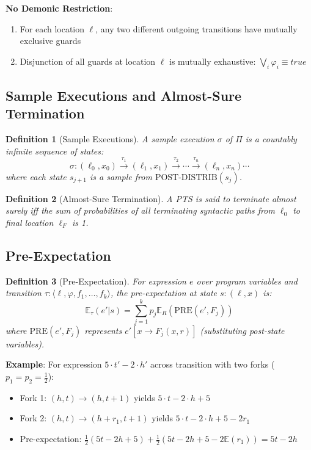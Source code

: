 \documentclass{article}
\newtheorem{definition}{Definition}
\begin{document}
\textbf{No Demonic Restriction}:
\begin{enumerate}
    \item For each location $\ell$, any two different outgoing transitions have mutually exclusive guards
    \item Disjunction of all guards at location $\ell$ is mutually exhaustive: $\bigvee_i \varphi_i \equiv true$
\end{enumerate}

\subsection{Sample Executions and Almost-Sure Termination}

\begin{definition}[Sample Executions]
A sample execution $\sigma$ of $\Pi$ is a countably infinite sequence of states:
\begin{equation}
\sigma: (\ell_0, x_0) \xrightarrow{\tau_1} (\ell_1, x_1) \xrightarrow{\tau_2} \cdots \xrightarrow{\tau_n} (\ell_n, x_n) \cdots
\end{equation}
where each state $s_{j+1}$ is a sample from $\text{POST-DISTRIB}(s_j)$.
\end{definition}

\begin{definition}[Almost-Sure Termination]
A PTS is said to terminate almost surely iff the sum of probabilities of all terminating syntactic paths from $\ell_0$ to final location $\ell_F$ is 1.
\end{definition}

\subsection{Pre-Expectation}

\begin{definition}[Pre-Expectation]
For expression $e$ over program variables and transition $\tau: \langle \ell, \varphi, f_1, \ldots, f_k \rangle$, the pre-expectation at state $s: (\ell, x)$ is:
\begin{equation}
\mathbb{E}_\tau(e' | s) = \sum_{j=1}^k p_j \mathbb{E}_R(\text{PRE}(e', F_j))
\end{equation}
where $\text{PRE}(e', F_j)$ represents $e'[x \to F_j(x, r)]$ (substituting post-state variables).
\end{definition}

\textbf{Example}: For expression $5 \cdot t' - 2 \cdot h'$ across transition with two forks ($p_1 = p_2 = \frac{1}{2}$):
\begin{itemize}
    \item Fork 1: $(h, t) \to (h, t+1)$ yields $5 \cdot t - 2 \cdot h + 5$
    \item Fork 2: $(h, t) \to (h+r_1, t+1)$ yields $5 \cdot t - 2 \cdot h + 5 - 2r_1$
    \item Pre-expectation: $\frac{1}{2}(5t - 2h + 5) + \frac{1}{2}(5t - 2h + 5 - 2\mathbb{E}(r_1)) = 5t - 2h$
\end{itemize}
\end{document}

